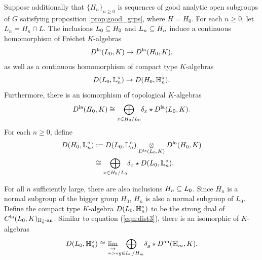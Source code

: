 \documentclass[10pt]{amsart}
\begin{document}
Suppose additionally that $\{H_{n}\}_{n\geq 0}$ is sequences of good analytic open subgroups of $G$ satisfying proposition \ref{prop:good_grps}, where $H=H_{0}$. For each $n\geq 0$, let $L_{n}=H_{n}\cap L$. The inclusions $L_{0}\subseteq H_{0}$ and $L_{n}\subseteq H_{n}$ induce a continuous homomorphism of Fr\'{e}chet $K$-algebras \[
    D^{\textnormal{la}}(L_{0},K) \rightarrow D^{\textnormal{la}}(H_{0},K),
\] as well as a continuous homomorphism of compact type $K$-algebras \[
    D(L_{0},\mathbb{L}_{n}^{\circ}) \rightarrow D(H_{0},\mathbb{H}_{n}^{\circ}) .
\] Furthermore, there is an isomorphism of topological $K$-algebras \begin{equation*}
    D^{\textnormal{la}}(H_{0},K) \cong \underset{x\in H_{0}/L_{0}}{\bigoplus} \delta_{x}\star D^{\textnormal{la}}(L_{0},K).
\end{equation*} For each $n\geq 0$, define \begin{align*}
    D(H_{0},\mathbb{L}_{n}^{\circ}) & := D(L_{0},\mathbb{L}_{n}^{\circ}) \underset{D^{\textnormal{la}}(L_{0},K)}{\otimes} D^{\textnormal{la}}(H_{0},K) \\
    & \cong \underset{x\in H_{0}/L_{0}}{\bigoplus} \delta_{x}\star D(L_{0},\mathbb{L}_{n}^{\circ}).
\end{align*} 

For all $n$ sufficiently large, there are also inclusions $H_{n}\subseteq L_{0}$. Since $H_{n}$ is a normal subgroup of the bigger group $H_{0}$, $H_{n}$ is also a normal subgroup of $L_{0}$. Define the compact type $K$-algebra $D(L_{0},\mathbb{H}_{n}^{\circ})$  to be the strong dual of $C^{\textnormal{la}}(L_{0},K)_{\mathbb{H}_{n}^{\circ}\textnormal{-an}}$. Similar to equation (\ref{eqn:dist3}), there is an isomorphic of $K$-algebras \[
    D(L_{0},\mathbb{H}_{n}^{\circ}) \cong \underset{\underset{m>n}{\rightarrow}}{\lim} \underset{{g\in L_{0}/H_{m}}}{\bigoplus} \delta_{g}\star D^{\textnormal{an}}(\mathbb{H}_{m},K). 
\]
\end{document}
